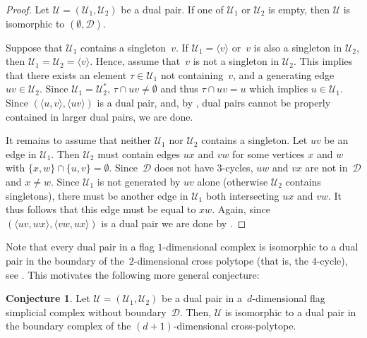 \documentclass[a4paper,12pt]{amsart}
\theoremstyle{plain}
\theoremstyle{definition}
\newtheorem{conjecture}[theorem]{Conjecture}
\newcommand{\U}{\mathcal U}
\newcommand{\D}{\mathcal D}
\newcommand{\smallface}{\tau}
\begin{document}
\begin{proof}
Let $\U = (\U_1,\U_2)$ be a dual pair. If one of $\U_1$ or $\U_2$ is empty, then $\U$ is isomorphic to $(\emptyset, \D)$.

Suppose that $\U_1$ contains a singleton~$v$. If $\U_1 = \langle v \rangle$ or~$v$ is also a singleton in $\U_2$, then $\U_1 = \U_2 = \langle v \rangle$. Hence, assume that~$v$ is not a singleton in $\U_2$. This implies that there exists an element $\smallface \in \U_1$ not containing~$v$, and a generating edge $uv \in \U_2$. Since $\U_1 = \U_2^*$, $\smallface \cap uv \neq \emptyset$ and thus $\smallface \cap uv = u$ which implies $u \in \U_1$. Since $(\langle u,v\rangle,\langle uv \rangle)$ is a dual pair, and, by , dual pairs cannot be properly contained in larger dual pairs, we are done.

It remains to assume that neither $\U_1$ nor $\U_2$ contains a singleton. Let $uv$ be an edge in $\U_1$. Then $\U_2$ must contain edges $ux$ and $vw$ for some vertices $x$ and $w$ with $\{x,w\} \cap \{u,v\} = \emptyset$.
Since~$\D$ does not have $3$-cycles, $uw$ and $vx$ are not in~$\D$ and $x \neq w$. Since $\U_1$ is not generated by $uv$ alone (otherwise $\U_2$ contains singletons), there must be another edge in $\U_1$ both intersecting $ux$ and $vw$. It thus follows that this edge must be equal to $xw$. Again, since $(\langle uv,wx\rangle,\langle vw,ux\rangle)$ is a dual pair we are done by .
\end{proof}

Note that every dual pair in a flag $1$-dimensional complex is isomorphic to a dual pair in the boundary of the~$2$-dimensional cross polytope (that is, the $4$-cycle), see . This motivates the following more general conjecture:

\begin{conjecture}
\label{conj:crosspolytopes}
  Let $\U=(\U_1,\U_2)$ be a dual pair in a~$d$-dimensional flag simplicial complex without boundary~$\D$. Then, $\U$ is isomorphic to a dual pair in the boundary complex of the $(d+1)$-dimensional cross-polytope.
\end{conjecture}
\end{document}
